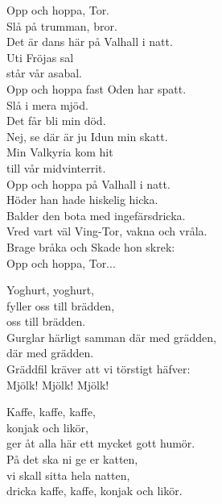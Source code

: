 \documentclass[a6paper, 10pt, twoside]{article}
\begin{document}
\noindent
\begin{center}
\end{center}
\begin{lyrics}
Opp och hoppa, Tor.\\
Slå på trumman, bror.\\
Det är dans här på Valhall i natt.\\
Uti Fröjas sal\\
står vår asabal.\\
Opp och hoppa fast Oden har spatt.\\
Slå i mera mjöd.\\
Det får bli min död.\\
Nej, se där är ju Idun min skatt.\\
Min Valkyria kom hit\\
till vår midvinterrit.\\
Opp och hoppa på Valhall i natt.
\vspace{5pt}\\
Höder han hade hiskelig hicka.\\
Balder den bota med ingefärsdricka.\\
Vred vart väl Ving-Tor, vakna och vråla.\\
Brage bråka och Skade hon skrek:
\vspace{5pt}\\
Opp och hoppa, Tor... 
\end{lyrics}

\noindent
\begin{center}
\end{center}
\begin{lyrics}
Yoghurt, yoghurt,\\
fyller oss till brädden,\\
oss till brädden.\\
Gurglar härligt samman där med grädden,\\
där med grädden.\\
Gräddfil kräver att vi törstigt häfver:\\
Mjölk! Mjölk! Mjölk!
\end{lyrics}
\vspace{40pt}
\begin{center}
\end{center}
\begin{lyrics}
Kaffe, kaffe, kaffe,\\
konjak och likör,\\
ger åt alla här ett mycket gott humör.\\
På det ska ni ge er katten,\\
vi skall sitta hela natten,\\
dricka kaffe, kaffe, konjak och likör.
\end{lyrics}
\end{document}
